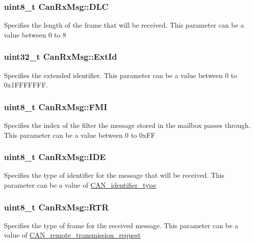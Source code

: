 \subsubsection[{D\+L\+C}]{\setlength{\rightskip}{0pt plus 5cm}uint8\+\_\+t Can\+Rx\+Msg\+::\+D\+L\+C}\label{struct_can_rx_msg_abf77d3abf9ad290c08cdfd5d99ebc745}
Specifies the length of the frame that will be received. This parameter can be a value between 0 to 8 \hypertarget{struct_can_rx_msg_a1fdca10d31c81eea2ccef41d2aced562}{}
\subsubsection[{Ext\+Id}]{\setlength{\rightskip}{0pt plus 5cm}uint32\+\_\+t Can\+Rx\+Msg\+::\+Ext\+Id}\label{struct_can_rx_msg_a1fdca10d31c81eea2ccef41d2aced562}
Specifies the extended identifier. This parameter can be a value between 0 to 0x1\+F\+F\+F\+F\+F\+F\+F. \hypertarget{struct_can_rx_msg_a5afe39d8e295659eeb3030593828b96a}{}
\subsubsection[{F\+M\+I}]{\setlength{\rightskip}{0pt plus 5cm}uint8\+\_\+t Can\+Rx\+Msg\+::\+F\+M\+I}\label{struct_can_rx_msg_a5afe39d8e295659eeb3030593828b96a}
Specifies the index of the filter the message stored in the mailbox passes through. This parameter can be a value between 0 to 0x\+F\+F \hypertarget{struct_can_rx_msg_a83a67d1a709cc01570ce956e5adc811f}{}
\subsubsection[{I\+D\+E}]{\setlength{\rightskip}{0pt plus 5cm}uint8\+\_\+t Can\+Rx\+Msg\+::\+I\+D\+E}\label{struct_can_rx_msg_a83a67d1a709cc01570ce956e5adc811f}
Specifies the type of identifier for the message that will be received. This parameter can be a value of \hyperlink{group___c_a_n__identifier__type}{C\+A\+N\+\_\+identifier\+\_\+type} \hypertarget{struct_can_rx_msg_a9a183149a391a24f86da2ce895f0f1c9}{}
\subsubsection[{R\+T\+R}]{\setlength{\rightskip}{0pt plus 5cm}uint8\+\_\+t Can\+Rx\+Msg\+::\+R\+T\+R}\label{struct_can_rx_msg_a9a183149a391a24f86da2ce895f0f1c9}
Specifies the type of frame for the received message. This parameter can be a value of \hyperlink{group___c_a_n__remote__transmission__request}{C\+A\+N\+\_\+remote\+\_\+transmission\+\_\+request} \hypertarget{struct_can_rx_msg_a62769e18836146f71238bee6b43b531e}{}
